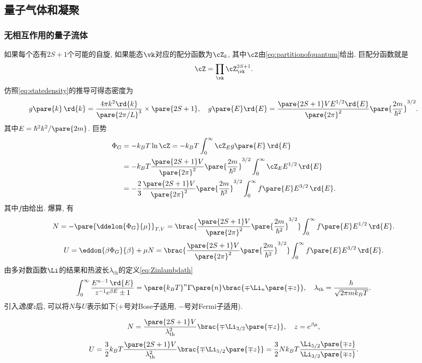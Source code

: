 \documentclass[../Thermal.tex]{subfiles}
\begin{document}
\subsection{量子气体和凝聚}
\subsubsection{无相互作用的量子流体}
如果每个态有$2S+1$个可能的自旋, 如果能态$\vk$对应的配分函数为$\cZ_k$, 其中$\cZ$由\eqref{eq:partitionofquantum}给出. 巨配分函数就是
\[ \cZ = \prod_{\vk} \cZ_{\vk}^{2S+1}. \]
仿照\eqref{eq:statedensity}的推导可得态密度为
\[ g\pare{k}\,\rd{k} = \frac{4\pi k^2\rd{k}}{\pare{2\pi/L}^3}\times\pare{2S+1}, \quad g\pare{E}\rd{E} = \frac{\pare{2S+1}VE^{1/2}\rd{E}}{\pare{2\pi}^2}\pare{\frac{2m}{\hbar^2}}^{3/2}. \]
其中$E=\hbar^2k^2/\pare{2m}$. 巨势
\begin{align*}
\Phi_G &= -k_BT\ln \cZ = -k_BT\int_0^\infty \cZ_E g\pare{E}\,\rd{E} \\
&= -k_BT\frac{\pare{2S+1}V}{\pare{2\pi}^2}\pare{\frac{2m}{\hbar^2}}^{3/2}\int_0^\infty \cZ_E E^{1/2}\,\rd{E}\\
&= -\frac{2}{3} \frac{\pare{2S+1}V}{\pare{2\pi}^2}\pare{\frac{2m}{\hbar^2}}^{3/2}\int_0^\infty f\pare{E} E^{3/2}\,\rd{E}.
\end{align*}
其中$f$由给出. 爆算, 有
\begin{equation}
\label{eq:Ninintegral}
N = -\pare{\ddelon{\Phi_G}{\mu}}_{T,V} = \brac{\frac{\pare{2S+1}V}{\pare{2\pi}^2}\pare{\frac{2m}{\hbar^2}}^{3/2}} \int_0^\infty f\pare{E} E^{1/2}\,\rd{E}.
\end{equation}
\begin{equation}
\label{eq:Uinintegral}
U = \eddon{\beta\Phi_G}{\beta} + \mu N = \brac{\frac{\pare{2S+1}V}{\pare{2\pi}^2}\pare{\frac{2m}{\hbar^2}}^{3/2}} \int_0^\infty f\pare{E} E^{3/2}\,\rd{E}.
\end{equation}
由多对数函数$\Li$的结果和热波长$\lambda_{\mathrm{th}}$的定义\eqref{eq:Zinlambdath}
\[ \int_0^\infty \frac{E^{n-1}\,\rd{E}}{z^{-1}e^{\beta E} \pm 1} = \pare{k_BT}^n\Gamma\pare{n}\brac{\mp \Li_n\pare{\mp z}},\quad \lambda_{\mathrm{th}} = \frac{h}{\sqrt{2\pi mk_B T}}. \]
引入\emph{逸度}$z$后, 可以将$N$与$U$表示如下($+$号对Bose子适用, $-$号对Fermi子适用).
\begin{finale}
\[ N = \frac{\pare{2S+1}V}{\lambda_{\mathrm{th}}^2}\brac{\mp \Li_{3/2}\pare{\mp z}},\quad z = e^{\beta\mu}, \]
\[ U = \frac{3}{2}k_B T \frac{\pare{2S+1}V}{\lambda_{\mathrm{th}}^2}\brac{\mp \Li_{5/2}\pare{\mp z}} = \frac{3}{2}Nk_B T \frac{\Li_{5/2}\pare{\mp z}}{\Li_{3/2}\pare{\mp z}}. \]
\end{finale}
\end{document}
